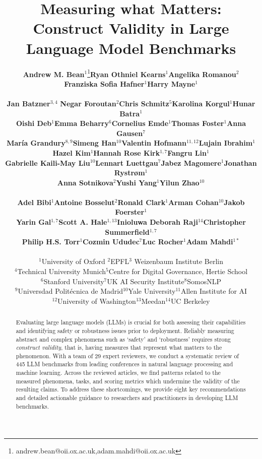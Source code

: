 \documentclass[tikz]{article}
\title{Measuring what Matters: Construct Validity in Large Language Model Benchmarks}
\author{\textbf{Andrew M. Bean}$^1$\thanks{andrew.bean@oii.ox.ac.uk,\quad adam.mahdi@oii.ox.ac.uk}\quad\textbf{Ryan Othniel Kearns}$^{1}$\quad\textbf{Angelika Romanou}$^2$\\\textbf{Franziska Sofia Hafner}$^1$\quad\textbf{Harry Mayne}$^1$\\ \\\textbf{Jan Batzner}$^{3,4}$ \quad \textbf{Negar Foroutan}$^2$\quad\textbf{Chris Schmitz}$^5$\quad\textbf{Karolina Korgul}$^1$\quad \textbf{Hunar Batra}$^1$\\\textbf{Oishi Deb}$^1$\quad\textbf{Emma Beharry}$^6$\quad\textbf{Cornelius Emde}$^1$\quad\textbf{Thomas Foster}$^1$\quad\textbf{Anna Gausen}$^7$\\\textbf{Mar\'ia Grandury}$^{8,9}$\quad\textbf{Simeng Han}$^{10}$\quad\textbf{Valentin Hofmann}$^{11,12}$\quad\textbf{Lujain Ibrahim}$^1$\\\textbf{Hazel Kim}$^1$\quad\textbf{Hannah Rose Kirk}$^{1,7}$\quad\textbf{Fangru Lin}$^1$\\\textbf{Gabrielle Kaili-May Liu}$^{10}$\quad\textbf{Lennart Luettgau}$^7$\quad\textbf{Jabez Magomere}$^1$\quad\textbf{Jonathan Rystr{\o}m}$^1$\\\textbf{Anna Sotnikova}$^2$\quad\textbf{Yushi Yang}$^1$\quad\textbf{Yilun Zhao}$^{10}$\\ \\\textbf{Adel Bibi}$^1$\quad\textbf{Antoine Bosselut}$^2$\quad\textbf{Ronald Clark}$^1$\quad\textbf{Arman Cohan}$^{10}$\quad\textbf{Jakob Foerster}$^1$\\\textbf{Yarin Gal}$^{1,7}$\quad\textbf{Scott A. Hale}$^{1,13}$\quad\textbf{Inioluwa Deborah Raji}$^{14}$\quad\textbf{Christopher Summerfield}$^{1,7}$\\\textbf{Philip H.S. Torr}$^1$\quad\textbf{Cozmin Ududec}$^7$\quad\textbf{Luc Rocher}$^1$\quad\textbf{Adam Mahdi}$^{1*}$\\ \\$^1$University of Oxford \quad $^2$EPFL\quad$^3$ Weizenbaum Institute Berlin\\ $^4$Technical University Munich\quad$^5$Centre for Digital Governance, Hertie School\\$^6$Stanford University\quad$^7$UK AI Security Institute\quad$^8$SomosNLP\\$^9$Universdad Polit\'ecnica de Madrid\quad$^{10}$Yale University\quad$^{11}$Allen Institute for AI\\$^{12}$University of Washington\quad$^{13}$Meedan\quad$^{14}$UC Berkeley
}}
\begin{document}
\maketitle

\doparttoc %
\faketableofcontents %

\begin{abstract}
   Evaluating large language models (LLMs) is crucial for both assessing their capabilities and identifying safety or robustness issues prior to deployment. Reliably measuring abstract and complex phenomena such as `safety' and `robustness' requires strong \textit{construct validity}, that is, having measures that represent what matters to the phenomenon. With a team of 29 expert reviewers, we conduct a systematic review of 445 LLM benchmarks from leading conferences in natural language processing and machine learning. Across the reviewed articles, we find patterns related to the measured phenomena, tasks, and scoring metrics which undermine the validity of the resulting claims. To address these shortcomings, we provide eight key recommendations and detailed actionable guidance to researchers and practitioners in developing LLM benchmarks.
\end{abstract}
\end{document}
